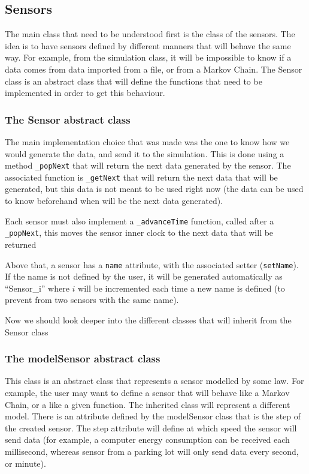 \subsection{Sensors}

The main class that need to be understood first is the class of the
sensors. The idea is to have sensors defined by different manners that will
behave the same way. For example, from the simulation class, it will be
impossible to know if a data comes from data imported from a file, or from
a Markov Chain. The Sensor class is an abstract class that will define the
functions that need to be implemented in order to get this behaviour.

\subsubsection{The Sensor abstract class}

The main implementation choice that was made was the one to know how we would
generate the data, and send it to the simulation. This is done using a method
\verb!_popNext! that will return the next data generated by the sensor. The
associated function is \verb!_getNext! that will return the next data that will
be generated, but this data is not meant to be used right now (the data can be
used to know beforehand when will be the next data generated).

Each sensor must also implement a \verb!_advanceTime! function, called after a
\verb!_popNext!, this moves the sensor inner clock to the next data that will
be returned

Above that, a sensor has a \verb!name! attribute, with the associated setter
(\verb!setName!). If the name is not defined by the user, it will be generated
automatically as ``Sensor\_i'' where $i$ will be incremented each time a new
name is defined (to prevent from two sensors with the same name).

Now we should look deeper into the different classes that will inherit from the
Sensor class

\subsubsection{The modelSensor abstract class}

This class is an abstract class that represents a sensor modelled by some
law. For example, the user may want to define a sensor that will behave like a
Markov Chain, or a like a given function. The inherited class will represent a
different model. There is an attribute defined by the modelSensor class that is
the step of the created sensor. The step attribute will define at which speed
the sensor will send data (for example, a computer energy consumption can be
received each millisecond, whereas sensor from a parking lot will only send
data every second, or minute).

